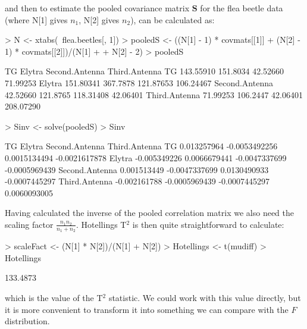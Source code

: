 and then to estimate the pooled covariance matrix $\boldsymbol{S}$ for the flea beetle data (where N[1] gives $n_{1}$,  N[2] gives $n_{2}$), can be calculated as:

\begin{Schunk}
\begin{Sinput}
> N <- xtabs(~flea.beetles[, 1])
> pooledS <- ((N[1] - 1) * covmats[[1]] + (N[2] - 1) * covmats[[2]])/(N[1] + 
+     N[2] - 2)
> pooledS
\end{Sinput}
\begin{Soutput}
                      TG   Elytra Second.Antenna Third.Antenna
TG             143.55910 151.8034       42.52660      71.99253
Elytra         151.80341 367.7878      121.87653     106.24467
Second.Antenna  42.52660 121.8765      118.31408      42.06401
Third.Antenna   71.99253 106.2447       42.06401     208.07290
\end{Soutput}
\begin{Sinput}
> Sinv <- solve(pooledS)
> Sinv
\end{Sinput}
\begin{Soutput}
                         TG        Elytra Second.Antenna Third.Antenna
TG              0.013257964 -0.0053492256   0.0015134494 -0.0021617878
Elytra         -0.005349226  0.0066679441  -0.0047337699 -0.0005969439
Second.Antenna  0.001513449 -0.0047337699   0.0130490933 -0.0007445297
Third.Antenna  -0.002161788 -0.0005969439  -0.0007445297  0.0060093005
\end{Soutput}
\end{Schunk}


Having calculated the inverse of the pooled correlation matrix we also need the scaling factor $\frac{n_{1} n_{2}}{n_{1} + n_{2}}$.   Hotellings T$^{2}$ is then quite straightforward to calculate:


\begin{Schunk}
\begin{Sinput}
> scaleFact <- (N[1] * N[2])/(N[1] + N[2])
> Hotellings <- t(mudiff) %*% Sinv %*% mudiff * scaleFact
> Hotellings
\end{Sinput}
\begin{Soutput}
         [,1]
[1,] 133.4873
\end{Soutput}
\end{Schunk}


which is the value of the T$^{2}$ statistic.   We could work with this value directly, but it is more convenient to transform it into something we can compare with the $F$ distribution.


